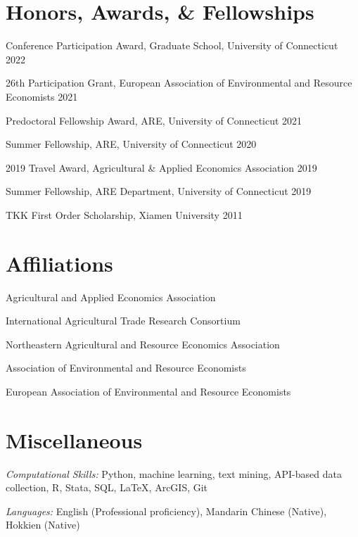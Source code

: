 \documentclass[10.5pt,letterpaper]{article}
\renewenvironment{itemize}{
	\begin{list}{}{
			\setlength{\leftmargin}{1.5em}
		}
	}{
	\end{list}
}
\begin{document}
\section*{\textbf{Honors, Awards, \& Fellowships}}
\begin{itemize}
	\item[-] Conference Participation Award, Graduate School, University of Connecticut \hfill 2022
	\item[-] 26th Participation Grant, European Association of Environmental and Resource Economists \hfill 2021
	\item[-] Predoctoral Fellowship Award, ARE, University of Connecticut \hfill 2021
	\item[-] Summer Fellowship, ARE, University of Connecticut \hfill 2020
	\item[-] 2019 Travel Award, Agricultural \& Applied Economics Association  \hfill 2019
	\item[-] Summer Fellowship, ARE Department, University of Connecticut \hfill 2019
	\item[-] TKK First Order Scholarship, Xiamen University \hfill 2011
\end{itemize}


	
	\section*{\textbf{Affiliations}}
	\begin{itemize}
		\item[-] Agricultural and Applied Economics Association
		\item[-] International Agricultural Trade Research Consortium
		\item[-] Northeastern Agricultural and Resource Economics Association
		\item[-] Association of Environmental and Resource Economists
		\item[-] European Association of Environmental and Resource Economists
	\end{itemize}
	
	\section*{\textbf{Miscellaneous}}
	\begin{itemize}
 
\item[-] \textit{Computational Skills:} Python, machine learning, text mining, API-based data collection, R, Stata, SQL, \LaTeX, ArcGIS, Git



\item[-] \textit{Languages:} English (Professional proficiency), Mandarin Chinese (Native), Hokkien (Native)

	\end{itemize}
	
\end{document}
